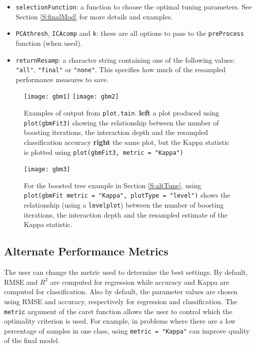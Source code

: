 \documentclass[12pt]{article}
\newcommand{\code}[1]{\mbox{\footnotesize\color{darkblue}\texttt{#1}}}
\newcommand{\pkg}[1]{{\fontseries{b}\selectfont #1}}
\renewcommand{\pkg}[1]{{\textsf{#1}}}
\begin{document}
\begin{itemize}
  performance summaries. See Section \ref{S:altPerf} for more
  details. 
\item \code{selectionFunction}: a function to choose the optimal
  tuning parameters. See Section \ref{S:finalMod} for more details
  and examples. 
\item \code{PCAthresh}, \code{ICAcomp} and \code{k}: these are
  all options to pass to the \code{preProcess} function (when used).
\item \code{returnResamp}: a character string containing one of
  the following values: \code{"all"}, \code{"final"} or
  \code{"none"}. This specifies how much of the resampled
  performance measures to save.  
\end{itemize}



\begin{figure}
   \begin{center}		
      \texttt{[image: gbm1]}
      \hspace*{.2 in}
      \texttt{[image: gbm2]}    

      \caption{ Examples of output from \code{plot.tain}. {\bf left} a plot produced using
        \code{plot(gbmFit3)} showing the relationship between the
        number of boosting iterations, the interaction depth and the
        resampled classification accuracy {\bf right} the same
        plot, but the Kappa statistic is plotted using
        \code{plot(gbmFit3, metric = "Kappa")}} 
      \label{f:plots1} 
    \end{center}
\end{figure} 

\begin{figure}
  \begin{center}	
    \texttt{[image: gbm3]}      
    \caption{For the boosted tree example in Section \ref{S:altTune}, using
      \code{plot(gbmFit metric = "Kappa", plotType = "level")} shows
      the relationship (using a \code{levelplot}) between the number of
      boosting iterations, the interaction depth and the resampled
      estimate of the Kappa statistic.  }
    \label{f:plots2}         
  \end{center}
\end{figure}   


\subsection{Alternate Performance Metrics}\label{S:altPerf}

The user can change the metric used to determine the best settings. By
default, RMSE and $R^2$ are computed for regression while accuracy and
Kappa are computed for classification. Also by default, the parameter
values are chosen using RMSE and accuracy, respectively  for
regression and classification. The \code{metric} argument of the
\pkg{caret} function allows the user to control which the
optimality criterion is used. For example, in problems where there are
a low percentage of samples in one class, using \code{metric =
  "Kappa"} can improve quality of the final model. 
\end{document}
